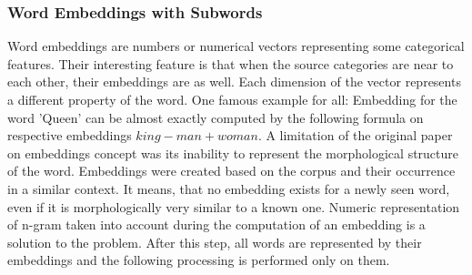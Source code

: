 \subsubsection{Word Embeddings with Subwords}
 Word embeddings are numbers or numerical vectors representing some categorical features. Their interesting feature is that when the source categories are near to each other, their embeddings are as well. Each dimension of the vector represents a different property of the word. One famous example for all: Embedding for the word 'Queen' can be almost exactly computed by the following formula on respective embeddings
 $king - man + woman$. A limitation of the original paper on embeddings \cite{mikolov2013efficient} concept was its inability to represent the morphological structure of the word. Embeddings were created based on the corpus and their occurrence in a similar context. It means, that no embedding exists for a newly seen word, even if it is morphologically very similar to a known one. Numeric representation of n-gram taken into account during the computation of an embedding is a solution to the problem.\cite{ngram_embedd}
 After this step, all words are represented by their embeddings and the following processing is performed only on them. 
